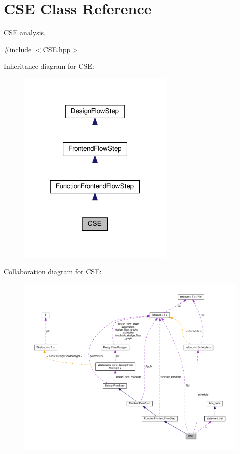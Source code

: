 \hypertarget{classCSE}{}\section{C\+SE Class Reference}
\label{classCSE}


\hyperlink{classCSE}{C\+SE} analysis.  




{\ttfamily \#include $<$C\+S\+E.\+hpp$>$}



Inheritance diagram for C\+SE\+:
\nopagebreak
\begin{figure}[H]
\begin{center}
\leavevmode
\includegraphics[width=214pt]{da/d2c/classCSE__inherit__graph}
\end{center}
\end{figure}


Collaboration diagram for C\+SE\+:
\nopagebreak
\begin{figure}[H]
\begin{center}
\leavevmode
\includegraphics[width=350pt]{d8/d8c/classCSE__coll__graph}
\end{center}
\end{figure}
